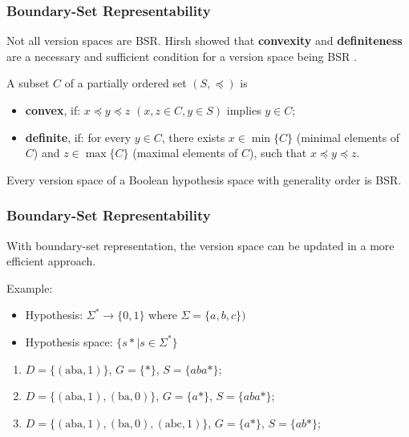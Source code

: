 \documentclass[]{beamer}
\begin{document}
\begin{frame}
\frametitle{Boundary-Set Representability}

Not all version spaces are BSR. Hirsh showed that \textbf{convexity} and \textbf{definiteness} are a necessary and sufficient condition for a version space being BSR \cite{hirsh}.
	
	A subset $C$ of a partially ordered set $(S, \preceq)$ is
	\begin{itemize}
		\item \textbf{convex}, if: $x \preceq y \preceq z$ $(x, z \in C, y \in S)$ implies $y \in C$;
		\item \textbf{definite}, if: for every $y \in C$, there exists $x \in \min\{C\}$ (minimal elements of $C$) and $z \in \max\{C\}$ (maximal elements of $C$), such that $x \preceq y \preceq z$.
	\end{itemize}

\pause

\begin{theorem}
	Every version space of a Boolean hypothesis space with generality order is BSR.
\end{theorem}
\end{frame}

\begin{frame}
\frametitle{Boundary-Set Representability}

With boundary-set representation, the version space can be updated in a more efficient approach.

\pause

Example:
\begin{itemize}
\item Hypothesis: $\Sigma^* \rightarrow \{0, 1\}$ where $\Sigma = \{a,b,c\})$
\item Hypothesis space: $\{ s* | s \in \Sigma^*\}$
\end{itemize}

\pause

\begin{enumerate}[<+->]
	\item $D = \{(\text{aba}, 1)\}$, $G = \{*\}$, $S = \{aba*\}$;
	\item $D = \{(\text{aba}, 1), (\text{ba}, 0)\}$, $G = \{a*\}$, $S = \{aba*\}$;
	\item $D = \{(\text{aba}, 1), (\text{ba}, 0), (\text{abc}, 1)\}$, $G = \{a*\}$, $S = \{ab*\}$;
\end{enumerate}

\end{frame}
\end{document}
